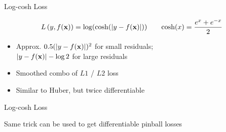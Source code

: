 \documentclass[11pt,compress,t,notes=noshow, xcolor=table]{beamer}
\begin{document}
\begin{frame}{Log-cosh Loss }


$$
L\left(y, f(\mathbf{x})\right) = \log ( \cosh(\left|y - f(\mathbf{x})\right|) ) \qquad \text{cosh}(x)=\frac{e^x+e^{-x}}{2}
$$

\vfill

\begin{itemize}
\item Approx. $0.5 (\left|y - f(\mathbf{x})\right|)^2$ for small residuals;\\
$\left|y - f(\mathbf{x})\right| - \log 2$ for large residuals
\item Smoothed combo of $L1$ / $L2$ loss
\item Similar to Huber, but twice differentiable
\end{itemize}

\vfill




\end{frame}

\begin{frame}{Log-cosh Loss }

\vfill
{}
{}

\vfill

Same trick can be used to get differentiable pinball losses

\end{frame}
\end{document}
